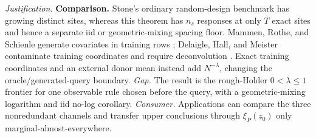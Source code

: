 \documentclass{article}
\begin{document}
\par\smallskip\noindent \textit{Justification.} \textbf{Comparison.} Stone's ordinary random-design benchmark \cite{Stone1982} has growing distinct sites, whereas this theorem has \(n_s\) responses at only \(T\) exact sites and hence a separate iid or geometric-mixing spacing floor. Mammen, Rothe, and Schienle generate covariates in training rows \cite{MammenRotheSchienle2012}; Delaigle, Hall, and Meister contaminate training coordinates and require deconvolution \cite{DelaigleHallMeister2008}. Exact training coordinates and an external donor mean instead add \(N^{-\lambda}\), changing the oracle/generated-query boundary. \textit{Gap.} The result is the rough-Holder \(0<\lambda\le1\) frontier for one observable rule chosen before the query, with a geometric-mixing logarithm and iid no-log corollary. \textit{Consumer.} Applications can compare the three nonredundant channels and transfer upper conclusions through \(\xi_P(z_0)\) only marginal-almost-everywhere.
\end{document}
